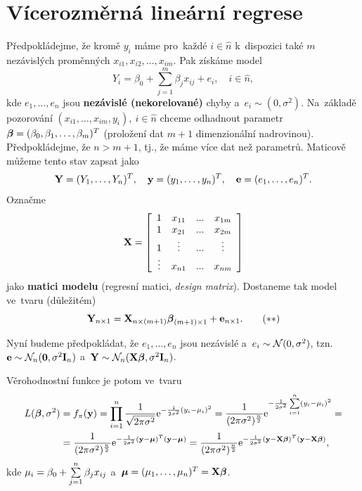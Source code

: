 \chapter{Vícerozměrná lineární regrese}

Předpokládejme, že kromě $y_i$ máme pro~každé $i\in\widehat{n}$ k~dispozici také $m$ nezávislých proměnných $x_{i1},x_{i2},\dots,x_{im}$. Pak získáme model
 $$ Y_i = \beta_0+\sum_{j = 1}^m \beta_j x_{ij}+e_i,\quad i\in\widehat{n}, $$
kde $e_1,\dots,e_n$ jsou \textbf{nezávislé (nekorelované)} chyby a~$e_i\sim(0,\sigma^2)$. Na~základě pozorování $(x_{i1},\dots,x_{im},y_i),~i\in\widehat{n}$ chceme odhadnout parametr $\boldsymbol{\beta} = (\beta_0,\beta_1,\dots,\beta_m)^T$ (proložení dat \linebreak $m+1$ dimenzionální nadrovinou). Předpokládejme, že $n>m+1$, tj., že máme více dat než parametrů. Maticově můžeme tento stav zapsat jako
 $$ \mathbf{Y} = (Y_1,\dots,Y_n)^T,\quad \mathbf{y} = (y_1,\dots,y_n)^T,\quad \mathbf{e} = (e_1,\dots,e_n)^T. $$
Označme
 $$ \mathbf{X} = \left[\begin{array}{cccc}
1 & x_{11} &... & x_{1m} \\
1 & x_{21} &... & x_{2m} \\
1 & \vdots &... & \vdots \\
 \vdots& x_{n1} &... & x_{nm}
\end{array}
 \right] $$ jako \textbf{matici modelu} (regresní matici, \textit{design matrix}). Dostaneme tak model ve~tvaru (důležitém)
  \begin{equation}\label{the_chosen_one}
 \mathbf{Y}_{n\times 1} = \mathbf{X}_{n\times(m+1)}\boldsymbol{\beta}_{(m+1)\times 1}+\mathbf{e}_{n\times 1}. \tag{$**$}
 \end{equation}

 Nyní budeme předpokládat, že $e_1,\dots,e_n$ jsou nezávislé a~$e_i \sim\mathcal{N}(0,\sigma^2)$, tzn. $\mathbf{e}\sim\mathcal{N}_n(\boldsymbol{0},\sigma^2 \textbf{I}_{n})$ a~$\mathbf{Y}\sim\mathcal{N}_n(\mathbf{X}\boldsymbol{\beta},\sigma^2 \textbf{I}_{n})$.

 Věrohodnostní funkce je potom ve~tvaru
 \begin{align*}
 L(\boldsymbol{\beta},\sigma^2)& = f_\pi(\mathbf{y}) = \prod_{i = 1}^n \frac{1}{\sqrt{2\pi\sigma^2}}\mathrm{e}^{-\frac{1}{2\sigma^2}(y_i-\mu_i)^2} = \frac{1}{(2\pi\sigma^2)^{\frac{n}{2}}}\mathrm{e}^{-\frac{1}{2\sigma^2}\sum\limits_{i=1}^{n} (y_i-\mu_i)^2} = \\ & = \frac{1}{(2\pi\sigma^2)^{\frac{n}{2}}}\mathrm{e}^{-\frac{1}{2\sigma^2}(\mathbf{y}-\boldsymbol{\mu})^T(\mathbf{y}-\boldsymbol{\mu})} = \frac{1}{(2\pi\sigma^2)^{\frac{n}{2}}}\mathrm{e}^{-\frac{1}{2\sigma^2}(\mathbf{y}-\mathbf{X}\boldsymbol{\beta})^T(\mathbf{y}-\mathbf{X}\boldsymbol{\beta})},
 \end{align*}
kde $\mu_i = \beta_0+\sum\limits_{j=1}^{n} \beta_j x_{ij}$ a~$\boldsymbol{\mu} = (\mu_1,\dots,\mu_n)^T = \mathbf{X}\boldsymbol{\beta}$.

